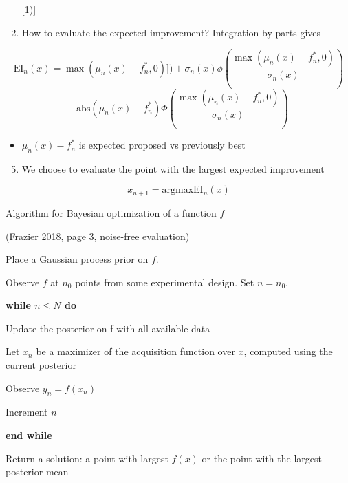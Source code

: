 \documentclass[
  ignorenonframetext,
]{beamer}
\providecommand{\tightlist}{%
  \setlength{\itemsep}{0pt}\setlength{\parskip}{0pt}}
\begin{document}
\begin{frame}

\begin{enumerate}
[1)]
\setcounter{enumi}{3}
\tightlist
\item
  How to evaluate the expected improvement? Integration by parts gives
\end{enumerate}

\[ \text{EI}_n(x)=\max(\mu_n(x)-f^{*}_n,0)])+\sigma_n(x) \phi(\frac{\max(\mu_n(x)-f^{*}_n,0)}{\sigma_n(x)}) \]
\[-\text{abs}(\mu_n(x)-f^{*}_n) \Phi(\frac{\max(\mu_n(x)-f^{*}_n,0)}{\sigma_n(x)})\]

\begin{itemize}
\tightlist
\item
  \(\mu_n(x)-f^{*}_n\) is expected proposed vs previously best
\end{itemize}

\begin{enumerate}
[1)]
\setcounter{enumi}{4}
\tightlist
\item
  We choose to evaluate the point with the largest expected improvement
\end{enumerate}

\[ x_{n+1}=\text{argmax}\text{EI}_n(x)\]

\end{frame}

\begin{frame}

\begin{block}{Algorithm for Bayesian optimization of a function \(f\)}

(Frazier 2018, page 3, noise-free evaluation)

Place a Gaussian process prior on \(f\).

Observe \(f\) at \(n_0\) points from some experimental design. Set
\(n=n_0\).

\textbf{while \(n \le N\) do}

Update the posterior on f with all available data

Let \(x_n\) be a maximizer of the acquisition function over \(x\),
computed using the current posterior

Observe \(y_n=f(x_n)\)

Increment \(n\)

\textbf{end while}

Return a solution: a point with largest \(f(x)\) or the point with the
largest posterior mean

\end{block}

\end{frame}
\end{document}
